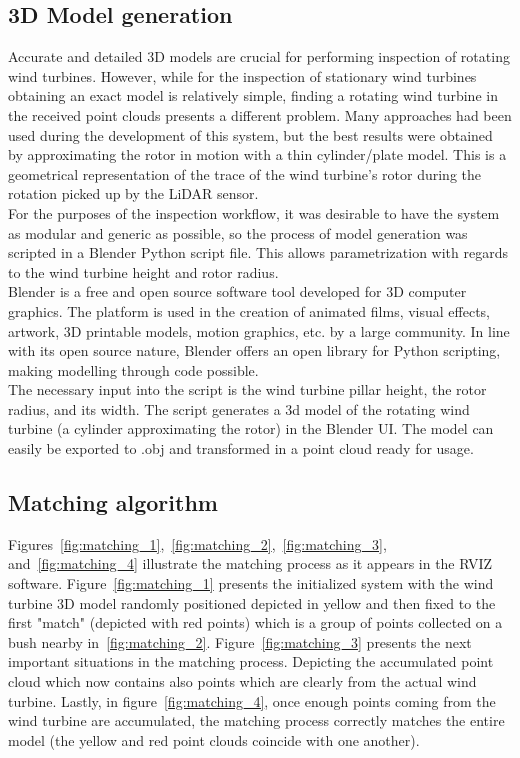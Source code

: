 \subsection{3D Model generation}
Accurate and detailed 3D models are crucial for performing inspection of rotating wind turbines. However, while for the inspection of stationary wind turbines obtaining an exact model is relatively simple, finding a rotating wind turbine in the received point clouds presents a different problem. Many approaches had been used during the development of this system, but the best results were obtained by approximating the rotor in motion with a thin cylinder/plate model. This is a geometrical representation of the trace of the wind turbine's rotor during the rotation picked up by the LiDAR sensor.\\
For the purposes of the inspection workflow, it was desirable to have the system as modular and generic as possible, so the process of model generation was scripted in a Blender Python script file. This allows parametrization with regards to the wind turbine height and rotor radius.\\
Blender is a free and open source software tool developed for 3D computer graphics. The platform is used in the creation of animated films, visual effects, artwork, 3D printable models, motion graphics, etc. by a large community. In line with its open source nature, Blender offers an open library for Python scripting, making modelling through code possible.\\
The necessary input into the script is the wind turbine pillar height, the rotor radius, and its width. The script generates a 3d model of the rotating wind turbine (a cylinder approximating the rotor) in the Blender UI. The model can easily be exported to .obj and transformed in a point cloud ready for usage.


\subsection{Matching algorithm}
Figures~\ref{fig:matching_1},~\ref{fig:matching_2},~\ref{fig:matching_3}, and~\ref{fig:matching_4} illustrate the matching process as it appears in the RVIZ software. Figure~\ref{fig:matching_1} presents the initialized system with the wind turbine 3D model randomly positioned depicted in yellow and then fixed to the first "match" (depicted with red points) which is a group of points collected on a bush nearby in~\ref{fig:matching_2}. Figure~\ref{fig:matching_3} presents the next important situations in the matching process. Depicting the accumulated point cloud which now contains also points which are clearly from the actual wind turbine. Lastly, in figure~\ref{fig:matching_4}, once enough points coming from the wind turbine are accumulated, the matching process correctly matches the entire model (the yellow and red point clouds coincide with one another).

